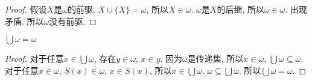 \begin{proof}
	假设$X$是$\omega$的前驱, $X\cup \{X\}=\omega$, 所以$X\in \omega$. $\omega$是$X$的后继, 所以$\omega \in \omega$. 出现矛盾. 所以$\omega$没有前驱.
\end{proof}

\begin{proposition}
	$\bigcup \omega=\omega$
\end{proposition}

\begin{proof}
	对于任意$x\in \bigcup \omega$, 存在$y\in \omega$, $x\in y$. 因为$\omega$是传递集, 所以$x\in \omega$, $\bigcup \omega \subseteq \omega$. 对于任意$x\in \omega$, $S(x)\in \omega$, $x\in S(x)$, 所以$x\in \bigcup \omega$, $\omega \subseteq \bigcup \omega$. 所以$\bigcup \omega=\omega$.
\end{proof}
